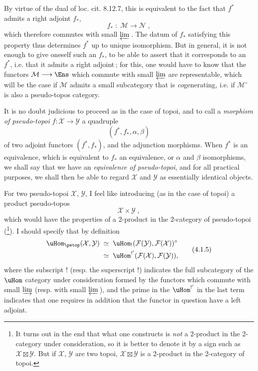 By virtue of the dual of loc. cit. 8.12.7, this is equivalent to the fact that $f^*$ admits a right adjoint $f_*$,
\[
f_* \;:\; \mathcal{M} \longrightarrow \mathcal{N}\;,
\tag*{(4.1.2)}
\]
which therefore commutes with small $\varprojlim$\,. The datum of $f_*$ satisfying this property thus determines $f^*$ up to unique isomorphism. But in general, it is not enough to give oneself such an $f_*$, to be able to assert that it corresponds to an $f^*$, i.e. that it admits a right adjoint\,; for this, one would have to know that the functors $\mathcal{M}\longrightarrow\Ens$ which commute with small $\varprojlim$ are representable, which will be the case if $\mathcal{M}$ admits a small subcategory that is \textit{co}generating, i.e. if $\mathcal{M}^\circ$ is also a pseudo-topos category. %

\newpage


It is no doubt judicious to proceed as in the case of topoi, and to call a \textit{morphism of pseudo-topoi} $f:\mathcal{X}\longrightarrow\mathcal{Y}$ a quadruple
\[
(f^*,f_*,\alpha,\beta)
\tag*{(4.1.3)}
\]
of two adjoint functors $(f^*,f_*)$, and the adjunction morphisms. When $f^*$ is an equivalence, which is equivalent to $f_*$ an equivalence, or $\alpha$ and $\beta$ isomorphisms, we shall say that we have an \textit{equivalence of pseudo-topoi}, and for all practical purposes, we shall then be able to regard $\mathcal{X}$ and $\mathcal{Y}$ as essentially identical objects.

For two pseudo-topoi $\mathcal{X}$, $\mathcal{Y}$, I feel like introducing (as in the case of topoi) a product pseudo-topos
\[
\mathcal{X}\times\mathcal{Y}\;,
\tag*{(4.1.4)}
\]
which would have the properties of a 2-product in the 2-category of pseudo-topoi (\footnote{It turns out in the end that what one constructs is \textit{not} a 2-product in the 2-category under consideration, so it is better to denote it by a sign such as $\mathcal{X}\boxtimes\mathcal{Y}$. But if $\mathcal{X}$, $\mathcal{Y}$ are two topoi, $\mathcal{X}\boxtimes\mathcal{Y}$ is a 2-product in the 2-category of topoi.}). I should specify that by definition
\[
\begin{aligned}
\uHom_{\pstop}(\mathcal{X},\mathcal{Y}) \;&\simeq\; \uHom_!(\mathcal{F}(\mathcal{Y}),\mathcal{F}(\mathcal{X}))^\circ\\
&\simeq\; \uHom^{!'}(\mathcal{F}(\mathcal{X}),\mathcal{F}(\mathcal{Y})),
\end{aligned}
\tag*{(4.1.5)}
\]
where the subscript ! (resp. the superscript !) indicates the full subcategory of the $\uHom$ category under consideration formed by the functors which commute with small $\varinjlim$ (resp. with small
$\varprojlim$\,), and the prime in the $\uHom^{!'}$ in the last term indicates that one requires in addition that the functor in question have a left adjoint.

